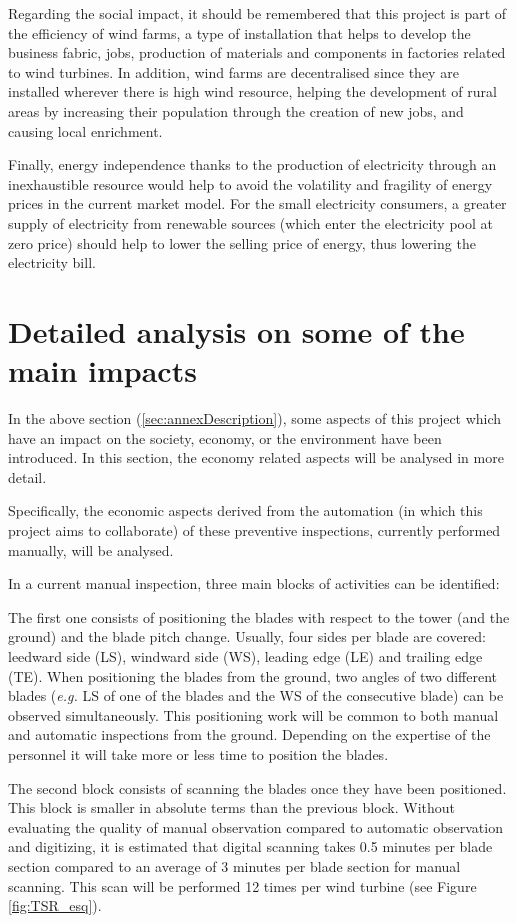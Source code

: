 Regarding the social impact, it should be remembered that this project is part of the efficiency of wind farms, a type of installation that helps to develop the business fabric, jobs, production of materials and components in factories related to wind turbines. In addition, wind farms are decentralised since they are installed wherever there is high wind resource,  helping the development of rural areas by increasing their population through the creation of new jobs, and causing local enrichment. 

Finally, energy independence thanks to the production of electricity through an inexhaustible resource would help to avoid the volatility and fragility of energy prices in the current market model. For the small electricity consumers, a greater supply of electricity from renewable sources (which enter the electricity pool at zero price) should help to lower the selling price of energy, thus lowering the electricity bill.

\section{Detailed analysis on some of the main impacts}
\label{sec:annexDetailed}

In the above section (\ref{sec:annexDescription}), some aspects of this project which have an impact on the society, economy, or the environment have been introduced. In this section, the economy related aspects will be analysed in more detail.

Specifically, the economic aspects derived from the automation (in which this project aims to collaborate) of these preventive inspections, currently performed manually, will be analysed. 

In a current manual inspection, three main blocks of activities can be identified:

The first one consists of positioning the blades with respect to the tower (and the ground) and the blade pitch change. Usually, four sides per blade are covered: leedward side (LS), windward side (WS), leading edge (LE) and trailing edge (TE). When positioning the blades from the ground, two angles of two different blades (\emph{e.g.} LS of one of the blades and the WS of the consecutive blade) can be observed simultaneously. This positioning work will be common to both manual and automatic inspections from the ground. Depending on the expertise of the personnel it will take more or less time to position the blades.

The second block consists of scanning the blades once they have been positioned. This block is smaller in absolute terms than the previous block. Without evaluating the quality of manual observation compared to automatic observation and digitizing, it is estimated that digital scanning takes 0.5 minutes per blade section compared to an average of 3 minutes per blade section for manual scanning. This scan will be performed 12 times per wind turbine (see Figure \ref{fig:TSR_esq}).

